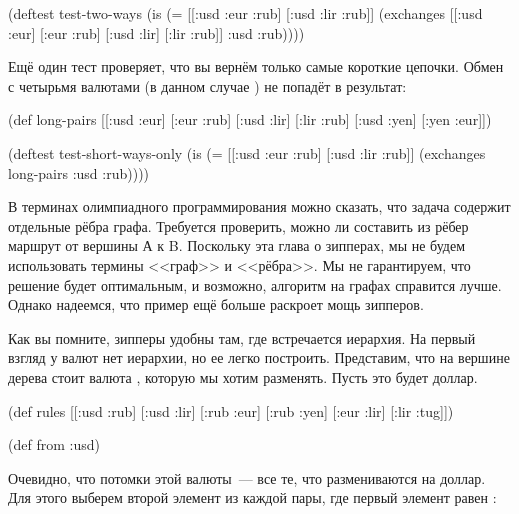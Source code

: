 \begin{english}
  \begin{clojure}
(deftest test-two-ways
  (is (= [[:usd :eur :rub]
          [:usd :lir :rub]]
         (exchanges [[:usd :eur]
                     [:eur :rub]
                     [:usd :lir]
                     [:lir :rub]] :usd :rub))))
  \end{clojure}
\end{english}

Ещё один тест проверяет, что вы вернём только самые короткие цепочки. Обмен с
четырьмя валютами (в данном случае ) не попадёт в
результат:

\begin{english}
  \begin{clojure}
(def long-pairs
  [[:usd :eur]
   [:eur :rub]
   [:usd :lir]
   [:lir :rub]
   [:usd :yen]
   [:yen :eur]])

(deftest test-short-ways-only
  (is (= [[:usd :eur :rub]
          [:usd :lir :rub]]
         (exchanges long-pairs :usd :rub))))
  \end{clojure}
\end{english}

В терминах олимпиадного программирования можно сказать, что задача содержит
отдельные рёбра графа. Требуется проверить, можно ли составить из рёбер маршрут
от вершины А к B. Поскольку эта глава о зипперах, мы не будем использовать
термины <<граф>> и <<рёбра>>. Мы не гарантируем, что решение будет оптимальным, и
возможно, алгоритм на графах справится лучше. Однако надеемся, что пример ещё
больше раскроет мощь зипперов.

Как вы помните, зипперы удобны там, где встречается иерархия. На первый взгляд у
валют нет иерархии, но ее легко построить. Представим, что на вершине дерева
стоит валюта , которую мы хотим разменять. Пусть это будет
доллар.

\begin{english}
  \begin{clojure}
(def rules
  [[:usd :rub]
   [:usd :lir]
   [:rub :eur]
   [:rub :yen]
   [:eur :lir]
   [:lir :tug]])

(def from :usd)
  \end{clojure}
\end{english}

Очевидно, что потомки этой валюты~--- все те, что размениваются на
доллар. Для этого выберем второй элемент из каждой пары, где первый элемент
равен :

